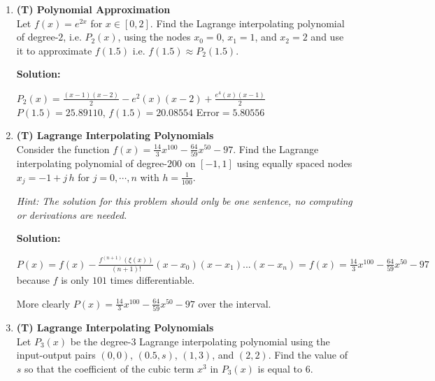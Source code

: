 \documentclass[12pt]{article}
\begin{document}
\begin{enumerate}[label=\bfseries Problem \arabic*:]
\item \textbf{(T) Polynomial Approximation}\\
Let $f(x)=e^{2x}$ for $x\in[0,2]$. Find the Lagrange interpolating polynomial of degree-$2$, i.e. $P_2(x)$, using the nodes $x_0=0$, $x_1=1$, and $x_2=2$ and use it to approximate $f(1.5)$ i.e. $f(1.5)\approx P_2(1.5)$. 




\vspace{1em}
\textbf{Solution:}\par 
$P_2(x)=\frac{(x-1)(x-2)}{2}-e^2(x)(x-2)+\frac{e^4(x)(x-1)}{2}$\\
$P(1.5)=25.89110$, $f(1.5)=20.08554$ Error$=5.80556$
\newpage




\item \textbf{(T) Lagrange Interpolating Polynomials}\\
Consider the function $f(x)=\frac{14}{3}x^{100} -\frac{64}{59}x^{50}-97$. Find the Lagrange interpolating polynomial of degree-$200$ on $[-1,1]$ using equally spaced nodes $x_j = -1+j\, h$ for $j=0, \cdots, n$ with $h = \frac{1}{100}$.

\textit{Hint: The solution for this problem should only be one sentence, no computing or derivations are needed.}





\vspace{1em}
\textbf{Solution:}\par 
$P(x)=f(x)-\frac{f^{(n+1)}(\xi(x))}{(n+1)!}(x-x_0)(x-x_1)...(x-x_n)=f(x)=\frac{14}{3}x^{100} -\frac{64}{59}x^{50}-97$ because $f$ is only $101$ times differentiable.\par 
More clearly $P(x)=\frac{14}{3}x^{100} -\frac{64}{59}x^{50}-97$ over the interval.
\newpage






\item \textbf{(T) Lagrange Interpolating Polynomials}\\
Let $P_3(x)$ be the degree-$3$ Lagrange interpolating polynomial using the input-output pairs $(0,0)$, $(0.5,s)$, $(1,3)$, and $(2,2)$. Find the value of $s$ so that the coefficient of the cubic term $x^3$ in $P_3(x)$ is equal to $6$.


\end{enumerate}
\end{document}
